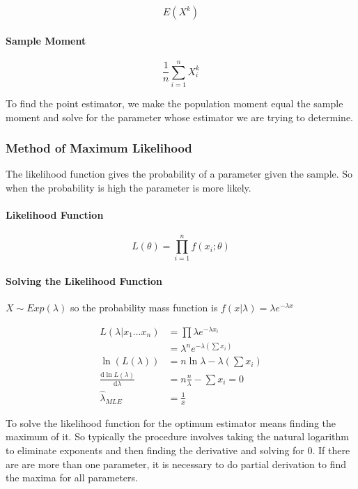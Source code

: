 \documentclass[a4paper, 10pt]{article}
\begin{document}
	\begin{equation*}
		E(X^k)
	\end{equation*}

	\paragraph{Sample Moment}

	\begin{equation*}
		\frac{1}{n}\sum_{i=1}^{n}X_{i}^{k}
	\end{equation*}

	\noindent To find the point estimator, we make the population moment equal the sample moment and solve for the parameter whose estimator we are trying to determine.

    \newpage
	\subsubsection{Method of Maximum Likelihood}

	The likelihood function gives the probability of a parameter given the sample. So when the probability is high the parameter is more likely.

	\paragraph{Likelihood Function}

	\begin{equation*}
		L(\theta) = \prod_{i=1}^{n}f(x_i;\theta)
	\end{equation*}

	\paragraph{Solving the Likelihood Function}

	\(X\sim Exp(\lambda)\) so the probability mass function is \(f(x|\lambda)=\lambda e^{-\lambda x}\)

	\begin{align*}
		L(\lambda |x_1\ldots x_n) &= \prod\lambda e^{-\lambda x_i} \\
		&= \lambda ^n e^{-\lambda\left(\sum x_i\right)} \\
		\ln\left(L(\lambda)\right) &= n\ln \lambda - \lambda\left(\sum x_i\right) \\
		\frac{\mathrm{d}\ln L(\lambda)}{\mathrm{d}\lambda} &= n\frac{n}{\lambda} - \sum x_i = 0 \\
		\hat{\lambda}_{MLE} &= \frac{1}{\bar{x}}
	\end{align*}

	\noindent To solve the likelihood function for the optimum estimator means finding the maximum of it. So typically the procedure involves taking the natural logarithm to eliminate exponents and then finding the derivative and solving for 0. If there are are more than one parameter, it is necessary to do partial derivation to find the maxima for all parameters.
\end{document}
